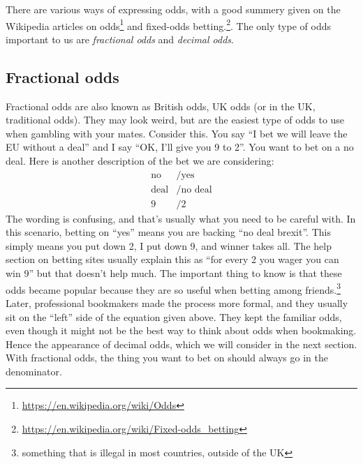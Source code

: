 \documentclass[a4paper]{article}
\begin{document}
There are various ways of expressing odds, with a good summery given on the Wikipedia articles on
odds\footnote{\url{https://en.wikipedia.org/wiki/Odds}}
and
fixed-odds betting.\footnote{\url{https://en.wikipedia.org/wiki/Fixed-odds_betting}}.
The only type of odds important to us are \emph{fractional odds} and \emph{decimal odds}.


\subsection{Fractional odds}
Fractional odds are also known as British odds, UK odds (or in the UK, traditional odds).
They may look weird, but are the easiest type of odds to use when gambling with your mates.
Consider this.
You say ``I bet we will leave the EU without a deal'' and I say ``OK, I'll give you 9 to 2''.
You want to bet on a no deal.
Here is another description of the bet we are considering:
\begin{align*}
\text{no}&/\text{yes}  \\
\text{deal}&/\text{no deal}  \\
9 &/ 2
\end{align*}
The wording is confusing, and that's usually what you need to be careful with.
In this scenario, betting on ``yes'' means you are backing ``no deal brexit''.
This simply means you put down 2, I put down 9, and winner takes all.
The help section on betting sites usually explain this as ``for every 2 you wager you can win 9'' but that doesn't help much.
The important thing to know is that these odds became popular because they are so useful when betting among friends.\footnote{something that is illegal in most countries, outside of the UK}
Later, professional bookmakers made the process more formal, and they usually sit on the ``left'' side of the equation given above.
They kept the familiar odds, even though it might not be the best way to think about odds when bookmaking. Hence the appearance of decimal odds, which we will consider in the next section.
With fractional odds, the thing you want to bet on should always go in the denominator.
\end{document}
